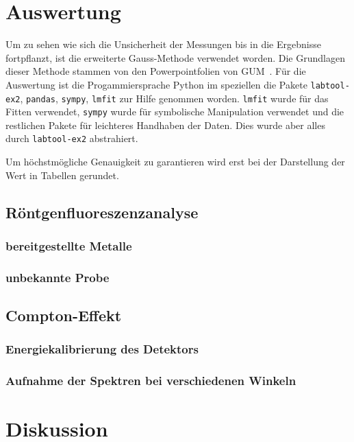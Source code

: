 \documentclass[12pt,english,ngerman]{scrartcl}
\begin{document}
\section{Auswertung}\label{sec:auswertung}

Um zu sehen wie sich die Unsicherheit der Messungen bis in die Ergebnisse
fortpflanzt, ist die erweiterte Gauss-Methode verwendet worden. Die Grundlagen
dieser Methode stammen von den Powerpointfolien von
GUM~\cite{wolfgang_kessel_isobipm-gum_2004}. Für die Auswertung ist die
Progammiersprache Python im speziellen die Pakete \verb#labtool-ex2#,
\verb#pandas#, \verb#sympy#, \verb#lmfit# zur Hilfe genommen worden.
\verb#lmfit# wurde für das Fitten verwendet, \verb#sympy# wurde für symbolische
Manipulation verwendet und die restlichen Pakete für leichteres Handhaben der
Daten. Dies wurde aber alles durch \verb#labtool-ex2# abstrahiert.

Um höchstmögliche Genauigkeit zu garantieren wird erst bei der Darstellung der
Wert in Tabellen gerundet.


\subsection{Röntgenfluoreszenzanalyse}

\subsubsection{bereitgestellte Metalle}


\subsubsection{unbekannte Probe}



\subsection{Compton-Effekt}

\subsubsection{Energiekalibrierung des Detektors}

\subsubsection{Aufnahme der Spektren bei verschiedenen Winkeln}


\section{Diskussion}\label{sec:diskussion}
\end{document}
